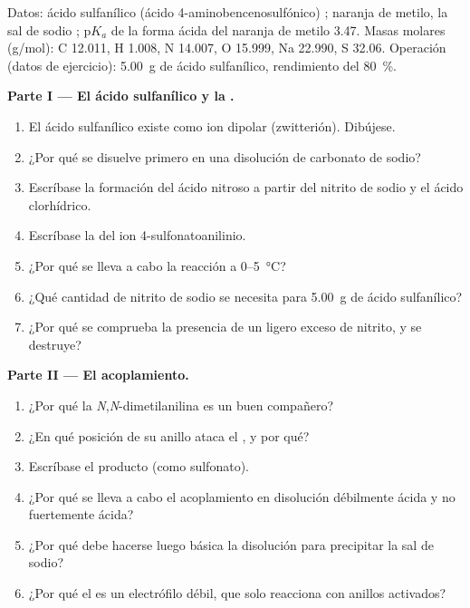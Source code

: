 \begin{problem}
\label{pb:b2:amines:1}
Datos: ácido sulfanílico (ácido 4-aminobencenosulfónico) ; naranja de metilo, la sal de sodio
; $\mathrm pK_a$ de la forma ácida del naranja de metilo 3.47. Masas molares
(\unit{g/mol}): C 12.011, H 1.008, N 14.007, O 15.999, Na 22.990, S 32.06. Operación (datos de ejercicio):
\qty{5.00}{g} de ácido sulfanílico, rendimiento del 80~\%.

\medskip
\noindent\textbf{Parte I --- El ácido sulfanílico y la .}
\begin{enumerate}
  \item El ácido sulfanílico existe como ion dipolar (zwitterión). Dibújese.
  \item ¿Por qué se disuelve primero en una disolución de carbonato de sodio?
  \item Escríbase la formación del ácido nitroso a partir del nitrito de sodio y el ácido clorhídrico.
  \item Escríbase la  del ion 4-sulfonatoanilinio.
  \item ¿Por qué se lleva a cabo la reacción a 0--\qty{5}{\degreeCelsius}?
  \item ¿Qué cantidad de nitrito de sodio se necesita para \qty{5.00}{g} de ácido sulfanílico?
  \item ¿Por qué se comprueba la presencia de un ligero exceso de nitrito, y se destruye?
\end{enumerate}

\medskip
\noindent\textbf{Parte II --- El acoplamiento.}
\begin{enumerate}[resume]
  \item ¿Por qué la \textit{N},\textit{N}-dimetilanilina es un buen compañero?
  \item ¿En qué posición de su anillo ataca el , y por qué?
  \item Escríbase el producto (como sulfonato).
  \item ¿Por qué se lleva a cabo el acoplamiento en disolución débilmente ácida y no fuertemente ácida?
  \item ¿Por qué debe hacerse luego básica la disolución para precipitar la sal de sodio?
  \item ¿Por qué el  es un electrófilo débil, que solo reacciona con anillos activados?
\end{enumerate}


\end{problem}
